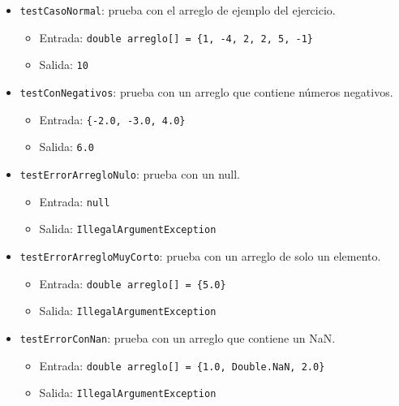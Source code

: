 \documentclass{article}
\begin{document}
\begin{itemize}
    \item \texttt{testCasoNormal}: prueba con el arreglo de ejemplo del ejercicio.
    
    \begin{itemize}
        \item Entrada: \texttt{double arreglo[] = \{1, -4, 2, 2, 5, -1\}}
        \item Salida: \texttt{10}
    \end{itemize}

    \item \texttt{testConNegativos}: prueba con un arreglo que contiene números negativos.

    \begin{itemize}
        \item Entrada: \texttt{\{-2.0, -3.0, 4.0\}}
        \item Salida: \texttt{6.0}
    \end{itemize}

    \item \texttt{testErrorArregloNulo}: prueba con un null.
    
    \begin{itemize}
        \item Entrada: \texttt{null}
        \item Salida: \mbox{\texttt{IllegalArgumentException}}
    \end{itemize}

    \item \texttt{testErrorArregloMuyCorto}: prueba con un arreglo de solo un elemento.
    
    \begin{itemize}
        \item Entrada: \texttt{double arreglo[] = \{5.0\}}
        \item Salida: \texttt{IllegalArgumentException}
    \end{itemize}

    \item \texttt{testErrorConNan}: prueba con un arreglo que contiene un NaN.
    
    \begin{itemize}
        \item Entrada: \texttt{double arreglo[] = \{1.0, Double.NaN, 2.0\}}
        \item Salida: \texttt{IllegalArgumentException}
    \end{itemize}


\end{itemize}
\end{document}
